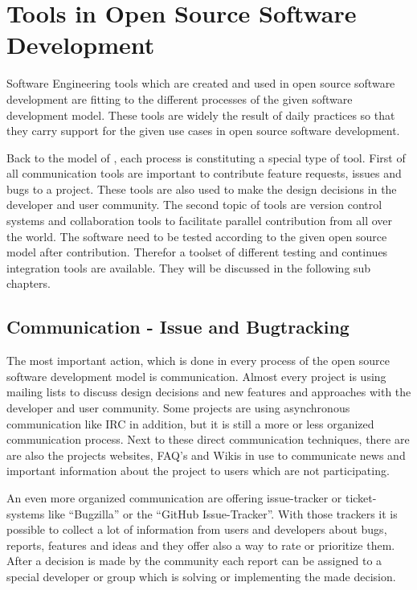 \documentclass[DIV=calc,paper=a4,fontsize=9pt,twocolumn]{scrartcl}
\begin{document}
\section{Tools in Open Source Software Development}

Software Engineering tools which are created and used in open source software development are fitting to the different processes of the given software development model. These tools are widely the result of daily practices so that they carry support for the given use cases in open source software development. \citep{Robbins02adoptingoss} 

Back to the model of \citet{Haddad11}, each process is constituting a special type of tool. First of all communication tools are important to contribute feature requests, issues and bugs to a project. These tools are also used to make the design decisions in the developer and user community. The second topic of tools are version control systems and collaboration tools to facilitate parallel contribution from all over the world. The software need to be tested according to the given open source model after contribution. Therefor a toolset of different testing and continues integration tools are available. They will be discussed in the following sub chapters.

\subsection{Communication - Issue and Bugtracking}

The most important action, which is done in every process of the open source software development model is communication. Almost every project is using mailing lists to discuss design decisions and new features and approaches with the developer and user community. Some projects are using asynchronous communication like IRC in addition, but it is still a more or less organized communication process. Next to these direct communication techniques, there are are also the projects websites, FAQ's and Wikis in use to communicate news and important information about the project to users which are not participating. \citep{ApacheFoundation13} 

An even more organized communication are offering issue-tracker or ticket-systems like \enquote{Bugzilla} or the \enquote{GitHub Issue-Tracker}. With those trackers it is possible to collect a lot of information from users and developers about bugs, reports, features and ideas and they offer also a way to rate or prioritize them. After a decision is made by the community each report can be assigned to a special developer or group which is solving or implementing the made decision.
\end{document}
